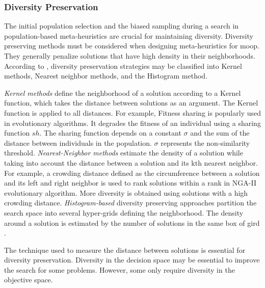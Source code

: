 \subsubsection{Diversity Preservation}
The initial population selection and the biased sampling during a search in population-based meta-heuristics are crucial for maintaining diversity. Diversity preserving methods must be considered when designing meta-heuristics for \gls{moop}. They generally penalize solutions that have high density in their neighborhoods. According to \parencite{Emmerich2018AMethods}, diversity preservation strategies may be classified into Kernel methods, Nearest neighbor methods, and the Histogram method.

\textit{Kernel methods} define the neighborhood of a solution according to a Kernel function, which takes the distance between solutions as an argument. The Kernel function is applied to all distances. For example, Fitness sharing is popularly used in evolutionary algorithms. It degrades the fitness of an individual using a sharing function $sh$. The sharing function depends on a constant $\sigma$ and the sum of the distance between individuals in the population.  $\sigma$ represents the non-similarity threshold. \textit{Nearest-Neighbor methods} estimate the density of a solution while taking into account the distance between a solution and its kth nearest neighbor. For example, a crowding distance defined as the circumference between a solution and its left and right neighbor is used to rank solutions within a rank in NGA-II evolutionary algorithm. More diversity is obtained using solutions with a high crowding distance. \textit{Histogram-based} diversity preserving approaches partition the search space into several hyper-grids defining the neighborhood. The density around a solution is estimated by the number of solutions in the same box of gird \parencite{Talbi2009Metaheuristics:Implementation}.

The technique used to measure the distance between solutions is essential for diversity preservation. Diversity in the decision space may be essential to improve the search for some problems. However, some only require diversity in the objective space.







 